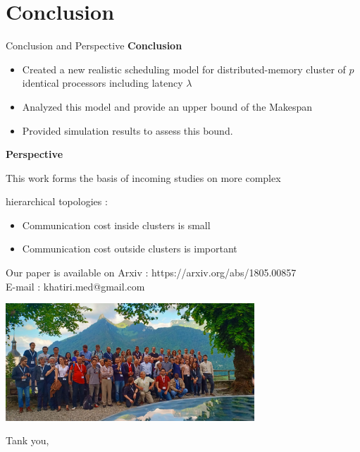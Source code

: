 \documentclass{beamer}
\begin{document}
 \section{Conclusion}
    \begin{frame}{Conclusion and Perspective}
        \textbf{Conclusion}
            \begin{itemize}
                \item Created a new realistic scheduling model for distributed-memory cluster of $p$ identical processors including latency $\lambda$
                \item Analyzed this model and provide an upper bound of the Makespan  
                \item Provided simulation results to assess this bound. 
            \end{itemize}

            \textbf{Perspective}

            \hspace{0.3cm}    This work forms the basis of incoming studies on more complex

            \hspace{0.3cm} hierarchical topologies :

            \begin{itemize}
                \item Communication cost inside clusters is small
                \item Communication cost outside clusters is important
            \end{itemize}

    \end{frame}


\begin{frame}
    \begin{center}
                Our paper is available on Arxiv : https://arxiv.org/abs/1805.00857 \\ 
                E-mail : \alert{khatiri.med@gmail.com}\\
    \end{center}

    \begin{center}
        \includegraphics[width=0.7\textwidth]{ECCO.jpeg} 

                Tank you,
    \end{center}
\end{frame}



\end{document}
